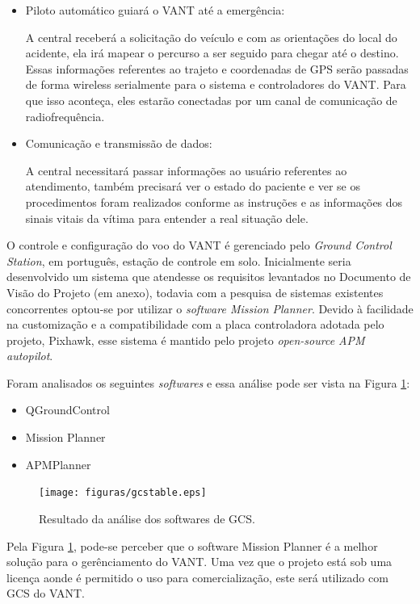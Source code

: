 \begin{itemize}
 \item Piloto automático guiará o VANT até a emergência: 

  A central receberá a solicitação do veículo e com as orientações do local do acidente, ela irá mapear o percurso a ser seguido para chegar até o destino.  Essas informações referentes ao trajeto e coordenadas de GPS serão passadas de forma wireless serialmente para o sistema e controladores do VANT. Para que isso aconteça, eles estarão conectadas por um canal de comunicação de radiofrequência. 

  \item Comunicação e transmissão de dados:

   A central necessitará passar informações ao usuário referentes ao atendimento, também precisará ver o estado do paciente e ver se os procedimentos foram realizados conforme as instruções e as informações dos sinais vitais da vítima para entender a real situação dele. 
\end{itemize}
O controle e configura\c{c}\~ao do voo do VANT \'e gerenciado pelo \textit{Ground Control Station}, em português, 
esta\c{c}\~ao de controle em solo. Inicialmente seria desenvolvido um sistema que atendesse os requisitos levantados no Documento
de Visão do Projeto (em anexo), todavia com a pesquisa de sistemas existentes concorrentes optou-se por utilizar o \textit{software Mission Planner}. 
Devido à facilidade na customização e a compatibilidade com a placa controladora adotada 
pelo projeto, Pixhawk, esse sistema é mantido pelo projeto \textit{open-source  APM autopilot}.\cite{gcs}

Foram analisados os seguintes \textit{softwares} e essa análise pode ser vista na Figura \ref{fig:gcstable}: 

\begin{itemize}
  \item QGroundControl
  \item Mission Planner
  \item APMPlanner
\end{itemize}

\begin{figure}[H]
    \centering
      \texttt{[image: figuras/gcstable.eps]}
    \caption{Resultado da análise dos softwares de GCS.}
    \label{fig:gcstable}
\end{figure}

\pagebreak
Pela Figura \ref{fig:gcstable}, pode-se perceber que o software Mission Planner é a melhor solução para o gerênciamento do VANT. Uma vez que o projeto está sob uma licença aonde é permitido o uso para comercialização, este será utilizado com GCS do VANT.

